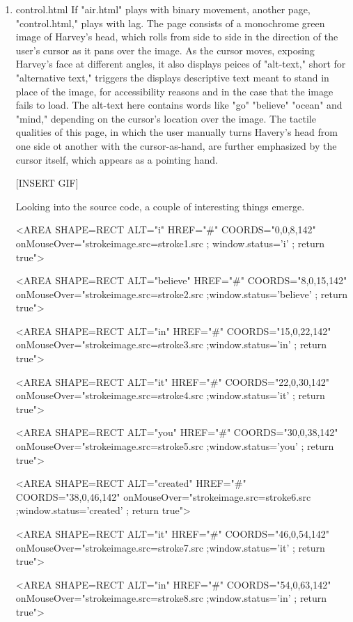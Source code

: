 \documentclass[11pt]{article}
\begin{document}
\begin{enumerate}
\item control.html
\label{sec:orgbf96c0b}
If "air.html" plays with binary movement, another page,
"control.html," plays with lag. The page consists of a monochrome
green image of Harvey's head, which rolls from side to side in the
direction of the user's cursor as it pans over the image. As the
cursor moves, exposing Harvey's face at different angles, it also
displays peices of "alt-text," short for "alternative text," triggers
the displays descriptive text meant to stand in place of the image,
for accessibility reasons and in the case that the image fails to
load. The alt-text here contains words like "go" "believe" "ocean" and
"mind," depending on the cursor's location over the image. The tactile
qualities of this page, in which the user manually turns Havery's head
from one side ot another with the cursor-as-hand, are further
emphasized by the cursor itself, which appears as a pointing hand.

[INSERT GIF]

Looking into the source code, a couple of interesting things
emerge. 

\begin{SOURCE}
<AREA SHAPE=RECT ALT="i" HREF="\#" COORDS="0,0,8,142"
onMouseOver="strokeimage.src=stroke1.src ; window.status='i' ; return
true">

<AREA SHAPE=RECT ALT="believe" HREF="\#" COORDS="8,0,15,142"
onMouseOver="strokeimage.src=stroke2.src ;window.status='believe' ;
return true">

<AREA SHAPE=RECT ALT="in" HREF="\#" COORDS="15,0,22,142"
onMouseOver="strokeimage.src=stroke3.src ;window.status='in' ; return
true">

<AREA SHAPE=RECT ALT="it" HREF="\#" COORDS="22,0,30,142"
onMouseOver="strokeimage.src=stroke4.src ;window.status='it' ; return
true">

<AREA SHAPE=RECT ALT="you" HREF="\#" COORDS="30,0,38,142"
onMouseOver="strokeimage.src=stroke5.src ;window.status='you' ; return
true">

<AREA SHAPE=RECT ALT="created" HREF="\#" COORDS="38,0,46,142"
onMouseOver="strokeimage.src=stroke6.src ;window.status='created' ;
return true">

<AREA SHAPE=RECT ALT="it" HREF="\#" COORDS="46,0,54,142"
onMouseOver="strokeimage.src=stroke7.src ;window.status='it' ; return
true">

<AREA SHAPE=RECT ALT="in" HREF="\#" COORDS="54,0,63,142"
onMouseOver="strokeimage.src=stroke8.src ;window.status='in' ; return
true">


\end{SOURCE}
\end{enumerate}
\end{document}
